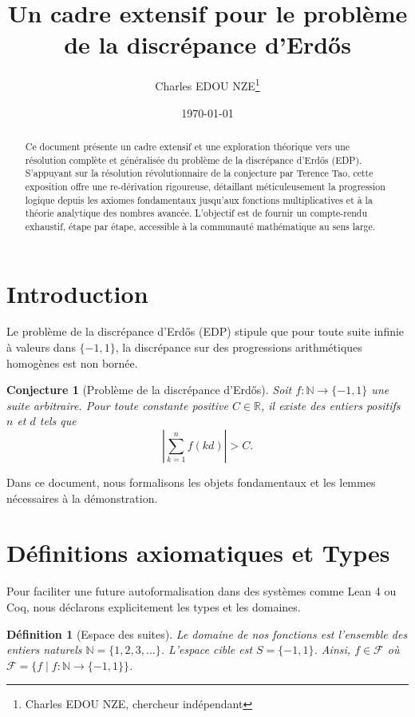 \documentclass[12pt]{article}
\title{Un cadre extensif pour le probl\`eme de la discr\'epance d'Erd\H{o}s}
\author{Charles EDOU NZE\thanks{Charles EDOU NZE, chercheur indépendant}}
\date{\today}
\newtheorem{definition}[theorem]{D\'efinition}
\newtheorem{conjecture}[theorem]{Conjecture}
\begin{document}
\maketitle

\begin{abstract}
Ce document pr\'esente un cadre extensif et une exploration th\'eorique vers une r\'esolution compl\`ete et g\'en\'eralis\'ee du probl\`eme de la discr\'epance d'Erd\H{o}s (EDP). S'appuyant sur la r\'esolution r\'evolutionnaire de la conjecture par Terence Tao, cette exposition offre une re-d\'erivation rigoureuse, d\'etaillant m\'eticuleusement la progression logique depuis les axiomes fondamentaux jusqu'aux fonctions multiplicatives et \`a la th\'eorie analytique des nombres avanc\'ee. L'objectif est de fournir un compte-rendu exhaustif, \'etape par \'etape, accessible \`a la communaut\'e math\'ematique au sens large.
\end{abstract}

\tableofcontents

\section{Introduction}

Le probl\`eme de la discr\'epance d'Erd\H{o}s (EDP) stipule que pour toute suite infinie \`a valeurs dans $\{-1, 1\}$, la discr\'epance sur des progressions arithm\'etiques homog\`enes est non born\'ee.

\begin{conjecture}[Probl\`eme de la discr\'epance d'Erd\H{o}s]
Soit $f : \mathbb{N} \to \{-1, 1\}$ une suite arbitraire. Pour toute constante positive $C \in \mathbb{R}$, il existe des entiers positifs $n$ et $d$ tels que
\[
\left| \sum_{k=1}^n f(kd) \right| > C.
\]
\end{conjecture}

Dans ce document, nous formalisons les objets fondamentaux et les lemmes n\'ecessaires \`a la d\'emonstration.

\section{D\'efinitions axiomatiques et Types}

Pour faciliter une future autoformalisation dans des syst\`emes comme Lean 4 ou Coq, nous d\'eclarons explicitement les types et les domaines.

\begin{definition}[Espace des suites]
Le domaine de nos fonctions est l'ensemble des entiers naturels $\mathbb{N} = \{1, 2, 3, \ldots\}$. L'espace cible est $S = \{-1, 1\}$. Ainsi, $f \in \mathcal{F}$ o\`u $\mathcal{F} = \{ f \mid f : \mathbb{N} \to \{-1, 1\} \}$.
\end{definition}
\end{document}
